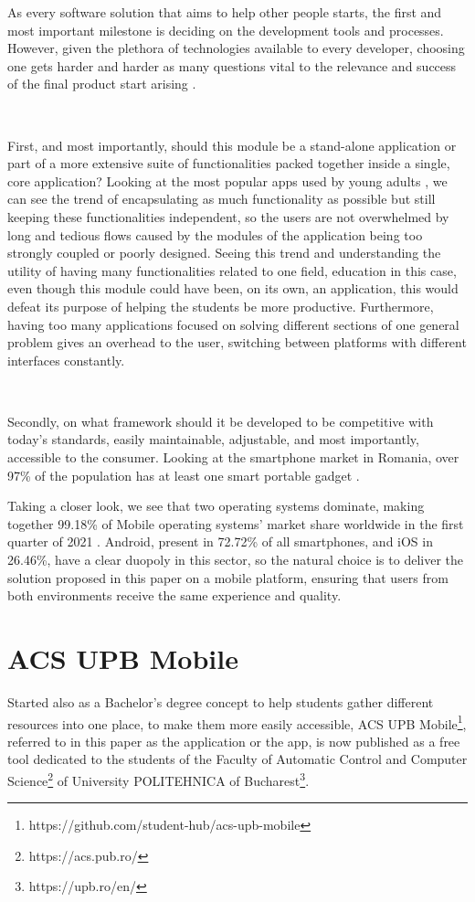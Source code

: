 As every software solution that aims to help other people starts, the first and most important milestone is deciding on the development tools and processes. However, given the plethora of technologies available to every developer, choosing one gets harder and harder as many questions vital to the relevance and success of the final product start arising \cite{russo1999first}.

~

First, and most importantly, should this module be a stand-alone application or part of a more extensive suite of functionalities packed together inside a single, core application? Looking at the most popular apps used by young adults \cite{traynor2016media}, we can see the trend of encapsulating as much functionality as possible but still keeping these functionalities independent, so the users are not overwhelmed by long and tedious flows caused by the modules of the application being too strongly coupled or poorly designed. Seeing this trend and understanding the utility of having many functionalities related to one field, education in this case, even though this module could have been, on its own, an application, this would defeat its purpose of helping the students be more productive. Furthermore, having too many applications focused on solving different sections of one general problem gives an overhead to the user, switching between platforms with different interfaces constantly.

~

Secondly, on what framework should it be developed to be competitive with today’s standards, easily maintainable, adjustable, and most importantly, accessible to the consumer. Looking at the smartphone market in Romania, over 97\% of the population has at least one smart portable gadget \cite{digital2021romania}. 

Taking a closer look, we see that two operating systems dominate, making together 99.18\% of Mobile operating systems' market share worldwide in the first quarter of 2021 \cite{statcounter2021mobileos}. Android, present in 72.72\% of all smartphones, and iOS in 26.46\%, have a clear duopoly in this sector, so the natural choice is to deliver the solution proposed in this paper on a mobile platform, ensuring that users from both environments receive the same experience and quality.


\section{ACS UPB Mobile} \label{1:acsupbmobile}
Started also as a Bachelor’s degree concept to help students gather different resources into one place, to make them more easily accessible, ACS UPB Mobile\footnote{https://github.com/student-hub/acs-upb-mobile}, referred to in this paper as the application or the app, is now published as a free tool dedicated to the students of the Faculty of Automatic Control and Computer Science\footnote{https://acs.pub.ro/} of University POLITEHNICA of Bucharest\footnote{https://upb.ro/en/}.

